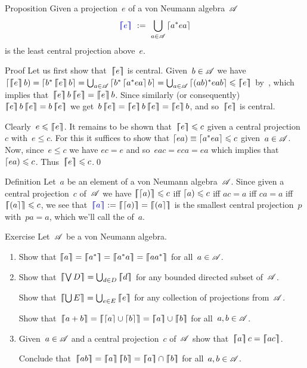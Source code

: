 \documentclass[a]{subfiles}
\begin{document}
\begin{parsec}%
\begin{point}{Proposition}%
Given a projection~$e$ of a von Neumann algebra~$\mathscr{A}$
\begin{equation*}
	\Define{\cceil{e}}\ :=\ 
	\bigcup_{a\in\scrA} \ceil{a^* e a}
\end{equation*}
is the least central projection above~$e$.
\begin{point}{Proof}%
Let us first show that~$\left\lceil\!\!\left\lceil e\right\rceil\!\!\right\rceil$ is central.
Given~$b\in\mathscr{A}$
we have $\ceill{\cceil{e}b}=\ceil{b^*\cceil{e}b}
=\bigcup_{a\in\scrA} \ceil{b^*\ceil{a^*ea}b}
= \bigcup_{a\in \scrA} \ceil{(ab)^* eab}
\leq \cceil{e}$
by~,
which implies that~$\cceil{e}b\cceil{e}=\cceil{e}b$.
Since similarly (or consequently)
$\cceil{e}b\cceil{e} = b\cceil{e}$
we get~$b\cceil{e}=\cceil{e}b\cceil{e}
=\cceil{e}b$,
and so~$\left\lceil\!\!\left\lceil e\right\rceil\!\!\right\rceil$ is central.

Clearly~$e\leqslant \left\lceil\!\!\left\lceil e\right\rceil\!\!\right\rceil$.
It remains to be shown that~$\left\lceil\!\!\left\lceil e\right\rceil\!\!\right\rceil\leqslant c$
given a central projection~$c$ with~$e\leq c$.
For this it suffices to show that $\left\lceil ea\right)\equiv \left\lceil a^*ea\right\rceil\leqslant c$
given~$a\in\mathscr{A}$.
Now, since~$e\leq c$
we have $ec=e$
and so~$eac=eca=ea$
which implies that~$\left\lceil ea\right)\leqslant c$.
Thus~$\left\lceil\!\!\left\lceil e\right\rceil\!\!\right\rceil\leqslant c$.\qed
\end{point}
\end{point}
\begin{point}[central support]{Definition}%
Let~$a$ be an element of a von Neumann algebra~$\mathscr{A}$.
Since given a central projection~$c$ of~$\mathscr{A}$
we have
$\left\lceil\!\!\left\lceil\left\lceil a\right)\right\rceil\!\!\right\rceil\leqslant c$
iff $\left\lceil a\right)\leqslant c$
iff $ac=a$ 
iff
$ca=a$ iff $\left\lceil\!\!\left\lceil\left(a\right\rceil\right\rceil\!\!\right\rceil\leqslant c$,
we see that~$\Define{\cceil{a}}:=
\cceil{\ceill{a}}=\cceil{\ceilr{a}}$
is the smallest central projection~$p$
with~$p a=a$,
which we'll call the
 of~$a$.
\end{point}
\begin{point}{Exercise}%
Let~$\mathscr{A}$ be a von Neumann algebra.
\begin{enumerate}
\item
Show that $\cceil{a}=\cceil{a^*}
=\cceil{a^*a}=\cceil{aa^*}$
for all~$a\in\mathscr{A}$.
\item
Show that~$\cceil{ \bigvee D } = \bigcup_{d\in D} \cceil{d}$
for any bounded directed subset of~$\mathscr{A}$.

Show that~$\cceil{\bigcup E} = \bigcup_{e\in E} \cceil{e}$
for any collection of projections from~$\mathscr{A}$.

Show that~$\cceil{a+b}=\cceil{\ceil{a}\cup \ceil{b}}
=\cceil{a}\cup\cceil{b}$
for all~$a,b\in \mathscr{A}$.
\item
Given~$a\in\mathscr{A}$
and a central projection~$c$ of~$\mathscr{A}$
show that~$\cceil{a}c=\cceil{ac}$.

Conclude that~$\cceil{ab}=\cceil{a}\cceil{b}
=\cceil{a}\cap\cceil{b}$
for all~$a,b\in\mathscr{A}$.
\end{enumerate}
\end{point}
\end{parsec}
\end{document}
